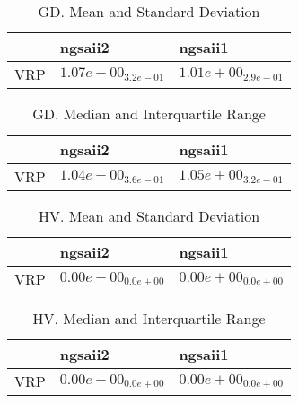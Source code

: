 \documentclass{article}
\begin{document}
\begin{table}
\caption{GD. Mean and Standard Deviation}
\label{table: GD}
\centering
\begin{scriptsize}
\begin{tabular}{lll}
\hline & ngsaii2 &  ngsaii1\\
\hline 
VRP & \cellcolor{gray25}$  1.07e+00_{ 3.2e-01}$ & \cellcolor{gray95}$  1.01e+00_{ 2.9e-01}$ \\
\hline
\end{tabular}
\end{scriptsize}
\end{table}

\begin{table}
\caption{GD. Median and Interquartile Range}
\label{table: GD}
\centering
\begin{scriptsize}
\begin{tabular}{lll}
\hline & ngsaii2 &  ngsaii1\\
\hline 
VRP & \cellcolor{gray95}$  1.04e+00_{ 3.6e-01}$ & \cellcolor{gray25}$  1.05e+00_{ 3.2e-01}$ \\
\hline
\end{tabular}
\end{scriptsize}
\end{table}

\begin{table}
\caption{HV. Mean and Standard Deviation}
\label{table: HV}
\centering
\begin{scriptsize}
\begin{tabular}{lll}
\hline & ngsaii2 &  ngsaii1\\
\hline 
VRP & $  0.00e+00_{ 0.0e+00}$ & $  0.00e+00_{ 0.0e+00}$ \\
\hline
\end{tabular}
\end{scriptsize}
\end{table}

\begin{table}
\caption{HV. Median and Interquartile Range}
\label{table: HV}
\centering
\begin{scriptsize}
\begin{tabular}{lll}
\hline & ngsaii2 &  ngsaii1\\
\hline 
VRP & $  0.00e+00_{ 0.0e+00}$ & $  0.00e+00_{ 0.0e+00}$ \\
\hline
\end{tabular}
\end{scriptsize}
\end{table}
\end{document}
